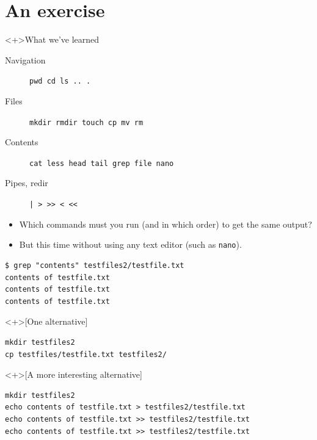 \section{An exercise}

\begin{frame}[fragile]
  \begin{block}<+>{What we've learned}
    \begin{description}
      \item[Navigation] \lstinline{pwd cd ls .. .}
      \item[Files] \lstinline{mkdir rmdir touch cp mv rm}
      \item[Contents] \lstinline{cat less head tail grep file nano}
      \item[Pipes, redir] \lstinline{| > >> < <<}
    \end{description}
  \end{block}

  \begin{exercise}
    \begin{itemize}
      \item Which commands must you run (and in which order) to get the same 
        output?
      \item But this time without using any text editor (such as 
        \lstinline{nano}).
    \end{itemize}
    \begin{lstlisting}[numbers=none]
$ grep "contents" testfiles2/testfile.txt
contents of testfile.txt
contents of testfile.txt
contents of testfile.txt
    \end{lstlisting}
  \end{exercise}
\end{frame}

\begin{frame}[fragile]
  \begin{solution}<+>[One alternative]
    \begin{lstlisting}
mkdir testfiles2
cp testfiles/testfile.txt testfiles2/
    \end{lstlisting}
  \end{solution}
  \begin{solution}<+>[A more interesting alternative]
    \begin{lstlisting}
mkdir testfiles2
echo contents of testfile.txt > testfiles2/testfile.txt
echo contents of testfile.txt >> testfiles2/testfile.txt
echo contents of testfile.txt >> testfiles2/testfile.txt
    \end{lstlisting}
  \end{solution}
\end{frame}


